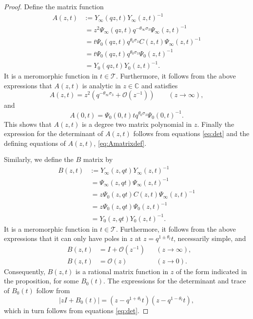 \documentclass[10pt,a4paper]{amsart}
\begin{document}
\begin{proof}
Define the matrix function
\begin{align}
 A(z,t)&:=Y_\infty(qz,t)Y_\infty(z,t)^{-1}\nonumber\\
 &\,=  z^2 \Psi_\infty(qz,t)q^{-\theta_\infty\sigma_3}\Psi_\infty(z,t)^{-1} \label{eq:Amatrixdef}\\
 &\,= t\Psi_0(qz,t)q^{\theta_0\sigma_3}C(z,t)\Psi_\infty(z,t)^{-1}\nonumber\\
 &\,= t\Psi_0(qz,t)q^{\theta_0\sigma_3}\Psi_0(z,t)^{-1}\nonumber\\
 &\,=Y_0(qz,t)Y_0(z,t)^{-1}.\nonumber
\end{align}
It is a meromorphic function in $t\in \mathcal{T}$. Furthermore, it follows from the above expressions that $A(z,t)$ is analytic in $z\in \mathbb{C}$ and satisfies 
\begin{equation*}
    A(z,t)=z^2(q^{-\theta_\infty\sigma_3}+\mathcal{O}(z^{-1}))\qquad (z\rightarrow \infty),
\end{equation*}
and
\begin{equation*}
A(0,t)=\Psi_0(0,t)tq^{\theta_0\sigma_3}\Psi_0(0,t)^{-1}.
\end{equation*}
This shows that $A(z,t)$ is a degree two matrix polynomial in $z$. Finally the expression for the determinant of $A(z,t)$ follows from equations \eqref{eq:det} and the defining equations of $A(z,t)$,  \eqref{eq:Amatrixdef}.

Similarly, we define the $B$ matrix by
\begin{align*}
 B(z,t)&:=Y_\infty(z,qt)Y_\infty(z,t)^{-1}\\
 &\,=\Psi_\infty(z,qt)\Psi_\infty(z,t)^{-1}\\
 &\,=z\Psi_0(z,qt)C(z,t)\Psi_\infty(z,t)^{-1}\\
 &\,=z\Psi_0(z,qt)\Psi_0(z,t)^{-1}\\
 &\,=Y_0(z,qt)Y_0(z,t)^{-1}.
\end{align*}
It is a meromorphic function in $t\in \mathcal{T}$. Furthermore, it follows from the above expressions that it can only have poles in $z$ at $z=q^{1\pm \theta_t}t$, necessarily simple, and
\begin{align*}
 & &  B(z,t)&=I+\mathcal{O}(z^{-1}) &  &(z\rightarrow \infty), &\\
&  &  B(z,t)&=\mathcal{O}(z) & &(z\rightarrow 0). &
\end{align*}
Consequently, $B(z,t)$ is a rational matrix function in $z$ of the form indicated in the proposition, for some $B_0(t)$. The expressions for the determinant and trace of $B_0(t)$ follow from
\begin{equation*}
|zI+B_0(t)|= (z-q^{1+\theta_t}t)(z-q^{1-\theta_t}t),
\end{equation*}
which in turn follows from equations \eqref{eq:det}.
\end{proof}
\end{document}
